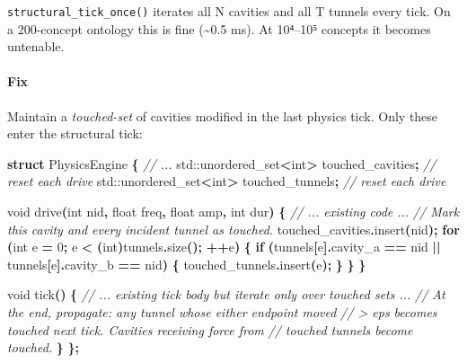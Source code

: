 \documentclass[
  11pt,
  a4paper,
]{article}
\newenvironment{Shaded}{\begin{snugshade}}{\end{snugshade}}
\newcommand{\BuiltInTok}[1]{#1}
\newcommand{\CommentTok}[1]{\textcolor[rgb]{0.56,0.35,0.01}{\textit{#1}}}
\newcommand{\ControlFlowTok}[1]{\textcolor[rgb]{0.13,0.29,0.53}{\textbf{#1}}}
\newcommand{\DataTypeTok}[1]{\textcolor[rgb]{0.13,0.29,0.53}{#1}}
\newcommand{\DecValTok}[1]{\textcolor[rgb]{0.00,0.00,0.81}{#1}}
\newcommand{\KeywordTok}[1]{\textcolor[rgb]{0.13,0.29,0.53}{\textbf{#1}}}
\newcommand{\NormalTok}[1]{#1}
\newcommand{\OperatorTok}[1]{\textcolor[rgb]{0.81,0.36,0.00}{\textbf{#1}}}
\begin{document}
\texttt{structural\_tick\_once()} iterates all N cavities and all T
tunnels every tick. On a 200-concept ontology this is fine
(\textasciitilde0.5 ms). At 10⁴--10⁵ concepts it becomes untenable.

\paragraph{Fix}\label{fix-3}

Maintain a \emph{touched-set} of cavities modified in the last physics
tick. Only these enter the structural tick:

\begin{Shaded}
\begin{Highlighting}[]
\KeywordTok{struct}\NormalTok{ PhysicsEngine }\OperatorTok{\{}
    \CommentTok{// ...}
    \BuiltInTok{std::}\NormalTok{unordered\_set}\OperatorTok{\textless{}}\DataTypeTok{int}\OperatorTok{\textgreater{}}\NormalTok{ touched\_cavities}\OperatorTok{;}    \CommentTok{// reset each drive}
    \BuiltInTok{std::}\NormalTok{unordered\_set}\OperatorTok{\textless{}}\DataTypeTok{int}\OperatorTok{\textgreater{}}\NormalTok{ touched\_tunnels}\OperatorTok{;}     \CommentTok{// reset each drive}

    \DataTypeTok{void}\NormalTok{ drive}\OperatorTok{(}\DataTypeTok{int}\NormalTok{ nid}\OperatorTok{,} \DataTypeTok{float}\NormalTok{ freq}\OperatorTok{,} \DataTypeTok{float}\NormalTok{ amp}\OperatorTok{,} \DataTypeTok{int}\NormalTok{ dur}\OperatorTok{)} \OperatorTok{\{}
        \CommentTok{// ... existing code ...}
        \CommentTok{// Mark this cavity and every incident tunnel as touched.}
\NormalTok{        touched\_cavities}\OperatorTok{.}\NormalTok{insert}\OperatorTok{(}\NormalTok{nid}\OperatorTok{);}
        \ControlFlowTok{for} \OperatorTok{(}\DataTypeTok{int}\NormalTok{ e }\OperatorTok{=} \DecValTok{0}\OperatorTok{;}\NormalTok{ e }\OperatorTok{\textless{}} \OperatorTok{(}\DataTypeTok{int}\OperatorTok{)}\NormalTok{tunnels}\OperatorTok{.}\NormalTok{size}\OperatorTok{();} \OperatorTok{++}\NormalTok{e}\OperatorTok{)} \OperatorTok{\{}
            \ControlFlowTok{if} \OperatorTok{(}\NormalTok{tunnels}\OperatorTok{[}\NormalTok{e}\OperatorTok{].}\NormalTok{cavity\_a }\OperatorTok{==}\NormalTok{ nid }\OperatorTok{||}\NormalTok{ tunnels}\OperatorTok{[}\NormalTok{e}\OperatorTok{].}\NormalTok{cavity\_b }\OperatorTok{==}\NormalTok{ nid}\OperatorTok{)} \OperatorTok{\{}
\NormalTok{                touched\_tunnels}\OperatorTok{.}\NormalTok{insert}\OperatorTok{(}\NormalTok{e}\OperatorTok{);}
            \OperatorTok{\}}
        \OperatorTok{\}}
    \OperatorTok{\}}

    \DataTypeTok{void}\NormalTok{ tick}\OperatorTok{()} \OperatorTok{\{}
        \CommentTok{// ... existing tick body but iterate only over touched sets ...}
        \CommentTok{// At the end, propagate: any tunnel whose either endpoint moved}
        \CommentTok{// \textgreater{} eps becomes touched next tick. Cavities receiving force from}
        \CommentTok{// touched tunnels become touched.}
    \OperatorTok{\}}
\OperatorTok{\};}
\end{Highlighting}
\end{Shaded}
\end{document}
